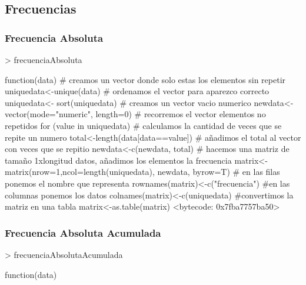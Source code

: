 \documentclass [a4paper] {article}
\begin{document}
\begin{center}
\subsection{Frecuencias}
\subsubsection{Frecuencia Absoluta}
\begin{Schunk}
\begin{Sinput}
> frecuenciaAbsoluta
\end{Sinput}
\begin{Soutput}
function(data){
  # creamos un vector donde solo estas los elementos sin repetir
  uniquedata<-unique(data)
  # ordenamos el vector para aparezco correcto 
  uniquedata<- sort(uniquedata)
  # creamos un vector vacio numerico
  newdata<- vector(mode="numeric", length=0)
  # recorremos el vector elementos no repetidos  
  for (value in uniquedata) {
    # calculamos la cantidad de veces que se repite un numero
    total<-length(data[data==value])
    # añadimos el total al vector con veces que se repitio
    newdata<-c(newdata, total)
  }
  # hacemos una matriz de tamaño 1xlongitud datos, añadimos los elementos la frecuencia
  matrix<-matrix(nrow=1,ncol=length(uniquedata), newdata, byrow=T)
  # en las filas ponemos el nombre que representa
  rownames(matrix)<-c("frecuencia")
  #en las columnas ponemos los datos
  colnames(matrix)<-c(uniquedata)
  #convertimos la matriz en una tabla
  matrix<-as.table(matrix)
}
<bytecode: 0x7fba7757ba50>
\end{Soutput}
\end{Schunk}
\subsubsection{Frecuencia Absoluta Acumulada}
\begin{Schunk}
\begin{Sinput}
> frecuenciaAbsolutaAcumulada
\end{Sinput}
\begin{Soutput}
function(data){

}
\end{Soutput}
\end{Schunk}
\end{center}
\end{document}

